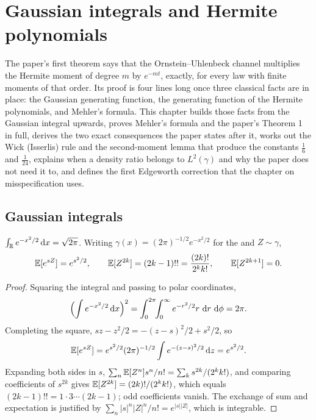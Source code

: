 \chapter{Gaussian integrals and Hermite polynomials}
\label{ch:gaussian-hermite}

The paper's first theorem says that the Ornstein--Uhlenbeck channel multiplies the
Hermite moment of degree $m$ by $e^{-mt}$, exactly, for every law with finite moments
of that order. Its proof is four lines long once three classical facts are in place:
the Gaussian generating function, the generating function of the Hermite polynomials,
and Mehler's formula. This chapter builds those facts from the Gaussian integral
upwards, proves Mehler's formula and the paper's Theorem 1 in full, derives the two
exact consequences the paper states after it, works out the Wick (Isserlis) rule and
the second-moment lemma that produce the constants $\tfrac16$ and $\tfrac1{24}$,
explains when a density ratio belongs to $L^2(\gamma)$ and why the paper does not need
it to, and defines the first Edgeworth correction that the chapter on
misspecification uses.

\section{Gaussian integrals}

\begin{lemma}
\label{lem:gauss-scalar}
$\int_{\mathbb{R}}e^{-x^2/2}\,\mathrm{d} x=\sqrt{2\pi}$. Writing $\gamma(x)=(2\pi)^{-1/2}e^{-x^2/2}$
for the  and $Z\sim\gamma$,
\begin{equation}
  \mathbb{E}[e^{sZ}]=e^{s^2/2},\qquad \mathbb{E}[Z^{2k}]=(2k-1)!!=\frac{(2k)!}{2^kk!},\qquad \mathbb{E}[Z^{2k+1}]=0.
  \label{eq:gauss-moments}
\end{equation}
\end{lemma}
\begin{proof}
Squaring the integral and passing to polar coordinates,
\[
  \Bigl(\int e^{-x^2/2}\,\mathrm{d} x\Bigr)^2=\int_0^{2\pi}\!\!\int_0^\infty e^{-r^2/2}r\,\,\mathrm{d} r\,\,\mathrm{d}\phi=2\pi .
\]
Completing the square, $sz-z^2/2=-(z-s)^2/2+s^2/2$, so
\[
  \mathbb{E}[e^{sZ}]=e^{s^2/2}(2\pi)^{-1/2}\int e^{-(z-s)^2/2}\,\mathrm{d} z=e^{s^2/2}.
\]
Expanding both sides in $s$, $\sum_n\mathbb{E}[Z^n]s^n/n!=\sum_k s^{2k}/(2^kk!)$, and comparing
coefficients of $s^{2k}$ gives $\mathbb{E}[Z^{2k}]=(2k)!/(2^kk!)$, which equals
$(2k-1)!!=1\cdot3\cdots(2k-1)$; odd coefficients vanish. The exchange of sum and expectation is justified by
$\sum_n|s|^n|Z|^n/n!=e^{|s||Z|}$, which is integrable.
\end{proof}

